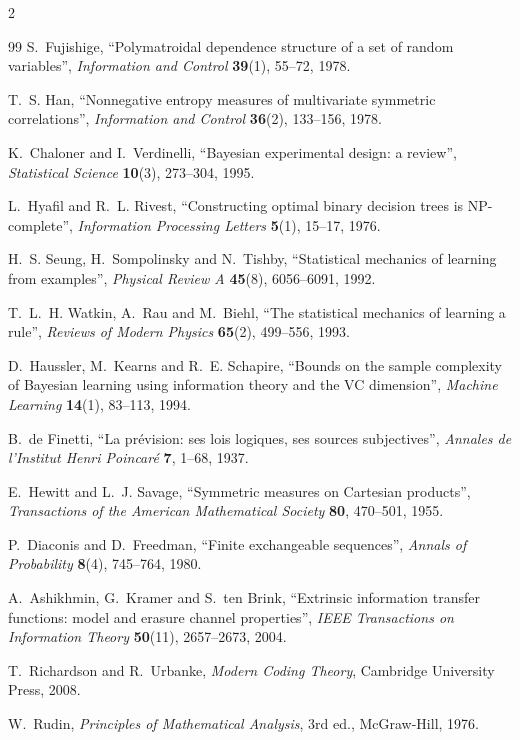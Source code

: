\documentclass[11pt]{article}
\begin{document}
\begin{multicols}{2}
\begin{thebibliography}{99}
S.~Fujishige,
``Polymatroidal dependence structure of a set of random variables'',
\emph{Information and Control} \textbf{39}(1), 55--72, 1978.

T.~S. Han,
``Nonnegative entropy measures of multivariate symmetric correlations'',
\emph{Information and Control} \textbf{36}(2), 133--156, 1978.

K.~Chaloner and I.~Verdinelli,
``Bayesian experimental design: a review'',
\emph{Statistical Science} \textbf{10}(3), 273--304, 1995.

L.~Hyafil and R.~L. Rivest,
``Constructing optimal binary decision trees is NP-complete'',
\emph{Information Processing Letters} \textbf{5}(1), 15--17, 1976.

H.~S. Seung, H.~Sompolinsky and N.~Tishby,
``Statistical mechanics of learning from examples'',
\emph{Physical Review A} \textbf{45}(8), 6056--6091, 1992.

T.~L.~H. Watkin, A.~Rau and M.~Biehl,
``The statistical mechanics of learning a rule'',
\emph{Reviews of Modern Physics} \textbf{65}(2), 499--556, 1993.

D.~Haussler, M.~Kearns and R.~E. Schapire,
``Bounds on the sample complexity of Bayesian learning using information
theory and the VC dimension'',
\emph{Machine Learning} \textbf{14}(1), 83--113, 1994.

B.~de Finetti,
``La pr\'evision: ses lois logiques, ses sources subjectives'',
\emph{Annales de l'Institut Henri Poincar\'e} \textbf{7}, 1--68, 1937.

E.~Hewitt and L.~J. Savage,
``Symmetric measures on Cartesian products'',
\emph{Transactions of the American Mathematical Society} \textbf{80},
470--501, 1955.

P.~Diaconis and D.~Freedman,
``Finite exchangeable sequences'',
\emph{Annals of Probability} \textbf{8}(4), 745--764, 1980.

A.~Ashikhmin, G.~Kramer and S.~ten Brink,
``Extrinsic information transfer functions: model and erasure channel
properties'',
\emph{IEEE Transactions on Information Theory} \textbf{50}(11),
2657--2673, 2004.

T.~Richardson and R.~Urbanke,
\emph{Modern Coding Theory},
Cambridge University Press, 2008.

W.~Rudin,
\emph{Principles of Mathematical Analysis}, 3rd ed.,
McGraw-Hill, 1976.


\end{thebibliography}
\end{multicols}
\end{document}
